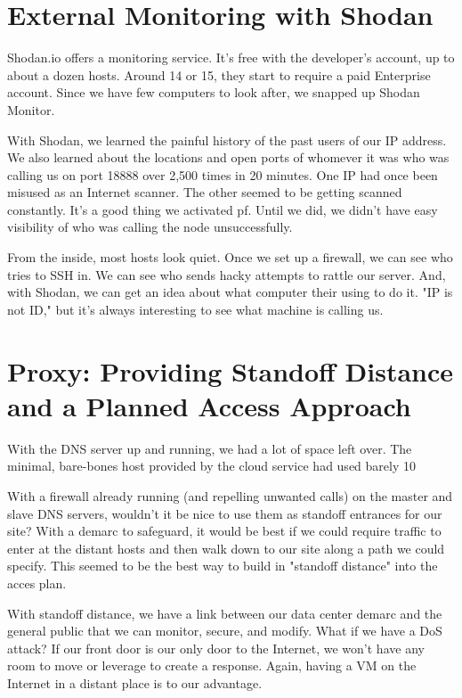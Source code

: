 \section{External Monitoring with Shodan}


Shodan.io offers a monitoring service.  It's free with the developer's account, up to about a dozen hosts.  Around 14 or 15, they start to require a paid Enterprise account.  Since we have few computers to look after, we snapped up Shodan Monitor.  

With Shodan, we learned the painful history of the past users of our IP address.  We also learned about the locations and open \gls{port}s of whomever it was who was calling us on \gls{port} 18888 over 2,500 times in 20 minutes.  One IP had once been misused as an Internet scanner.  The other seemed to be getting scanned constantly.  It's a good thing we activated pf.  Until we did, we didn't have easy visibility of who was calling the node unsuccessfully.  

From the inside, most hosts look quiet.  Once we set up a \gls{firewall}, we can see who tries to SSH in.  We can see who sends hacky attempts to rattle our server.  And, with Shodan, we can get an idea about what computer their using to do it.  "IP is not ID," but it's always interesting to see what machine is calling us.


\section{Proxy:  Providing Standoff Distance and a Planned Access Approach}
With the DNS server up and running, we had a lot of space left over. The minimal, bare-bones host provided by the cloud service had used barely 10%

With a \gls{firewall} already running (and repelling unwanted calls) on the master and slave DNS servers, wouldn't it be nice to use them as standoff entrances for our site?  With a demarc to safeguard, it would be best if we could require traffic to enter at the distant hosts and then walk down to our site along a path we could specify.  This seemed to be the best way to build in "standoff distance" into the acces plan.  

With standoff distance, we have a link between our data center demarc and the general public that we can monitor, secure, and modify.  What if we have a DoS attack?  If our front door is our only door to the Internet, we won't have any room to move or leverage to create a response.  Again, having a VM on the Internet in a distant place is to our advantage.  

